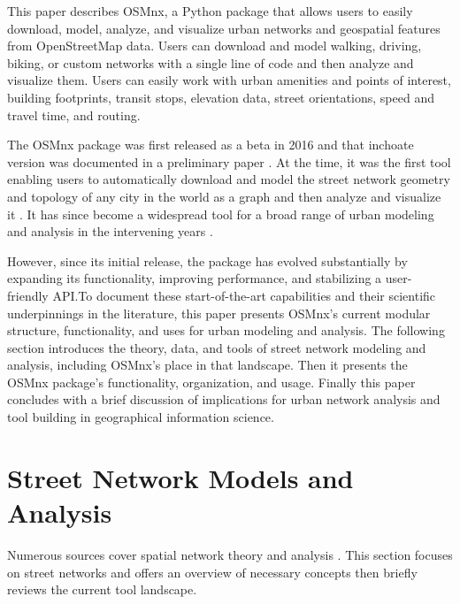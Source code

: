 \documentclass[12pt,letterpaper]{article} %
\begin{document}
This paper describes OSMnx, a Python package that allows users to easily download, model, analyze, and visualize urban networks and geospatial features from OpenStreetMap data. Users can download and model walking, driving, biking, or custom networks with a single line of code and then analyze and visualize them. Users can easily work with urban amenities and points of interest, building footprints, transit stops, elevation data, street orientations, speed and travel time, and routing.

The OSMnx package was first released as a beta in 2016 and that inchoate version was documented in a preliminary paper \citep{boeing_osmnx:_2017}. At the time, it was the first tool enabling users to automatically download and model the street network geometry and topology of any city in the world as a graph and then analyze and visualize it \citep{boeing_right_2020}. It has since become a widespread tool for a broad range of urban modeling and analysis in the intervening years \citep[e.g.,][]{coutrot_entropy_2022,dacci_signature_2019,feng_spatial_2020,gervasoni_calculating_2017,liao_disparities_2020,natera_orozco_data-driven_2020,yin_multi-task_2020,young_automatic_2020}.

However, since its initial release, the package has evolved substantially by expanding its functionality, improving performance, and stabilizing a user-friendly API.\@ To document these start-of-the-art capabilities and their scientific underpinnings in the literature, this paper presents OSMnx's current modular structure, functionality, and uses for urban modeling and analysis. The following section introduces the theory, data, and tools of street network modeling and analysis, including OSMnx's place in that landscape. Then it presents the OSMnx package's functionality, organization, and usage. Finally this paper concludes with a brief discussion of implications for urban network analysis and tool building in geographical information science.

\section{Street Network Models and Analysis}

Numerous sources cover spatial network theory and analysis \citep[e.g.,][]{tinkler_graph_1979,barnes_graph_1983,gastner_spatial_2006,barthelemy_spatial_2011,ducruet_spatial_2014,fischer_spatial_2014,marshall_street_2018}. This section focuses on street networks and offers an overview of necessary concepts then briefly reviews the current tool landscape.
\end{document}
